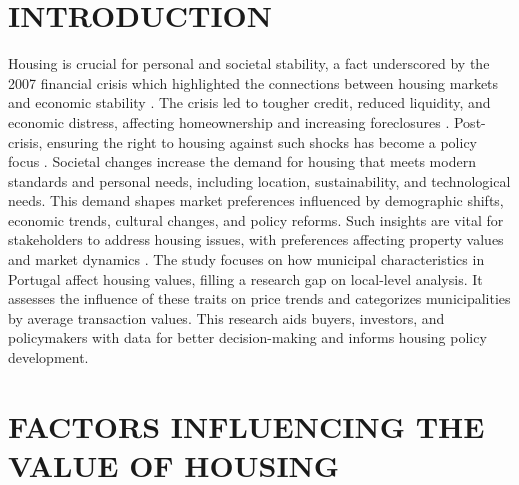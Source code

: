 \documentclass{aip-cp}
\begin{document}
\section{INTRODUCTION}
Housing is crucial for personal and societal stability, a fact underscored by the 2007 financial crisis which highlighted the connections between housing markets and economic stability \cite{DUCA2010203}. The crisis led to tougher credit, reduced liquidity, and economic distress, affecting homeownership and increasing foreclosures \cite{DUCA2010203}. Post-crisis, ensuring the right to housing against such shocks has become a policy focus \cite{DUCA2010203}.
%
Societal changes increase the demand for housing that meets modern standards and personal needs, including location, sustainability, and technological needs. This demand shapes market preferences influenced by demographic shifts, economic trends, cultural changes, and policy reforms. Such insights are vital for stakeholders to address housing issues, with preferences affecting property values and market dynamics \cite{EICHHOLTZ201419}.
%
The study focuses on how municipal characteristics in Portugal affect housing values, filling a research gap on local-level analysis. It assesses the influence of these traits on price trends and categorizes municipalities by average transaction values. This research aids buyers, investors, and policymakers with data for better decision-making and informs housing policy development.

\section{\uppercase{Factors influencing the value of housing}}
\end{document}
